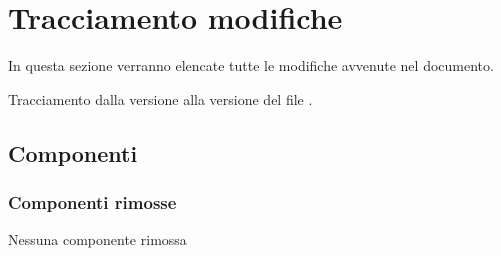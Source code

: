 \section{Tracciamento modifiche}
In questa sezione verranno elencate tutte le modifiche avvenute nel documento.

Tracciamento dalla versione  alla versione  del file .

\subsection{Componenti}
\subsubsection{Componenti rimosse}
Nessuna componente rimossa

